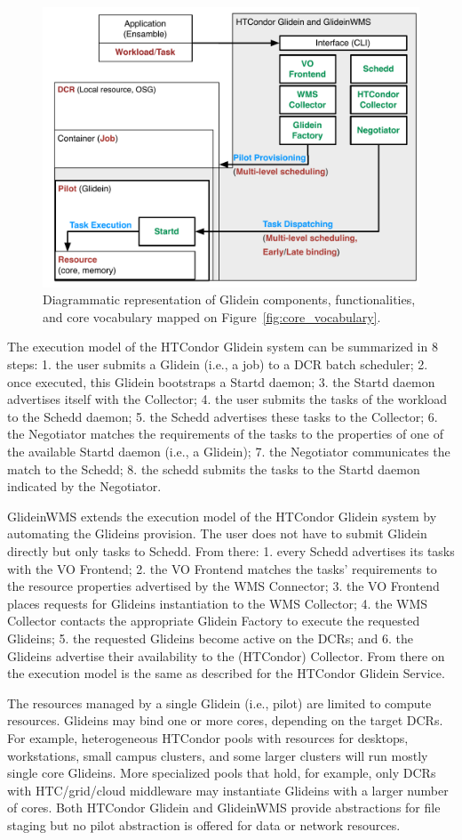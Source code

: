 \documentclass{sig-alternate}
\begin{document}
\begin{figure}[t]
    \centering
        \includegraphics[width=.48\textwidth]{figures/glidein_comparison.pdf}
        \caption{Diagrammatic representation of Glidein components,
          functionalities, and core vocabulary mapped on
          Figure~\ref{fig:core_vocabulary}.}
    \label{fig:glidein_comparison}
\end{figure}

The execution model of the HTCondor Glidein system can be summarized in 8
steps: 1. the user submits a Glidein (i.e., a job) to a DCR batch scheduler; 2.
once executed, this Glidein bootstraps a Startd daemon; 3. the Startd daemon
advertises itself with the Collector; 4. the user submits the tasks of the
workload to the Schedd daemon; 5. the Schedd advertises these tasks to the
Collector; 6. the Negotiator matches the requirements of the tasks to the
properties of one of the available Startd daemon (i.e., a Glidein); 7. the
Negotiator communicates the match to the Schedd; 8. the schedd submits the tasks
to the Startd daemon indicated by the Negotiator.

GlideinWMS extends the execution model of the HTCondor Glidein system by
automating the Glideins provision. The user does not have to submit Glidein
directly but only tasks to Schedd. From there: 1. every Schedd advertises its
tasks with the VO Frontend; 2. the VO Frontend matches the tasks' requirements
to the resource properties advertised by the WMS Connector; 3. the VO Frontend
places requests for Glideins instantiation to the WMS Collector; 4. the WMS
Collector contacts the appropriate Glidein Factory to execute the requested
Glideins; 5. the requested Glideins become active on the DCRs; and 6. the
Glideins advertise their availability to the (HTCondor) Collector. From there on
the execution model is the same as described for the HTCondor Glidein Service.


The resources managed by a single Glidein (i.e., pilot) are limited to compute
resources. Glideins may bind one or more cores, depending on the target DCRs.
For example, heterogeneous HTCondor pools with resources for desktops,
workstations, small campus clusters, and some larger clusters will run mostly
single core Glideins. More specialized pools that hold, for example, only DCRs
with HTC/grid/cloud middleware may instantiate Glideins with a larger number of
cores. Both HTCondor Glidein and GlideinWMS provide abstractions for file
staging but no pilot abstraction is offered for data or network resources.
\end{document}
